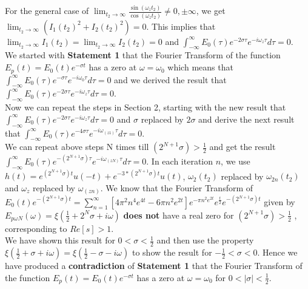 \documentclass[11pt]{elsarticle}
\begin{document}
For the general case of $\lim_{t_2 \to \infty} \frac{ \sin{ ( \omega_z t_2)}}{ \cos{ ( \omega_z t_2)}} \neq 0, \pm \infty$, we get $\lim_{t_2 \to \infty} (I_1(t_2)^{2} + I_2(t_2)^{2}) = 0$. This implies that $\lim_{t_2 \to \infty} I_1(t_2)= \lim_{t_2 \to \infty}I_2(t_2) = 0$ and $\int_{-\infty}^{\infty}     E_0(\tau) e^{-2 \sigma \tau} e^{-i  \omega_z \tau} d\tau = 0$. \\

We started with \textbf{Statement 1} that the Fourier Transform of the function $E_p(t) = E_0(t) e^{-\sigma t} $ has a zero at $\omega = \omega_{0}$ which means that $\int_{-\infty}^{\infty}    E_0(\tau) e^{- \sigma \tau} e^{-i \omega_0 \tau} d\tau = 0$ and we derived the result that $\int_{-\infty}^{\infty}    E_0(\tau) e^{-2 \sigma \tau} e^{-i  \omega_z \tau} d\tau = 0$.\\

Now we can repeat the steps in Section 2, starting with the new result that $\int_{-\infty}^{\infty}    E_0(\tau) e^{-2 \sigma \tau} e^{-i \omega_z \tau} d\tau = 0$ and $\sigma$ replaced by $2 \sigma$ and derive the next result that $\int_{-\infty}^{\infty}    E_0(\tau) e^{-4 \sigma \tau} e^{-i \omega_{(z1)} \tau} d\tau = 0$.\\

We can repeat above steps N times till $(2^{N+1} \sigma) > \frac{1}{2}$ and get the result $\int_{-\infty}^{\infty}    E_0(\tau) e^{-(2^{N+1} \sigma) \tau} e^{-i \omega_{(zN)} \tau} d\tau = 0$. In each iteration $n$, we use $h(t)=  e^{ (2^{N+1} \sigma) t} u(-t) + e^{ - 3*(2^{N+1} \sigma) t} u(t) $, $\omega_2(t_2)$ replaced by $\omega_{2n}(t_2)$ and $\omega_z$ replaced by $\omega_{(zn)}$. We know that  the Fourier Transform of $E_{0}(t) e^{-(2^{N+1} \sigma) t} =    \sum_{n=1}^{\infty}  [ 4 \pi^{2} n^{4} e^{4t}    - 6 \pi n^{2}   e^{2t} ]  e^{- \pi n^{2} e^{2t}} e^{\frac{t}{2}} e^{-(2^{N+1} \sigma) t}$ given by $E_{p\omega N}(\omega)=\xi(\frac{1}{2}+ 2^N \sigma + i \omega)$ \textbf{does not} have a real zero for $(2^{N+1} \sigma) > \frac{1}{2}$ , corresponding to $Re[s] > 1$. \\%

We have shown this result for $0 < \sigma < \frac{1}{2}$ and then use the property $\xi(\frac{1}{2} + \sigma + i \omega) = \xi(\frac{1}{2} - \sigma - i \omega)$ to show the result for $-\frac{1}{2} < \sigma < 0$. Hence we have produced a \textbf{contradiction} of  \textbf{Statement 1} that the Fourier Transform of the function $E_p(t) = E_0(t) e^{-\sigma t} $ has a zero at $\omega = \omega_{0}$ for  $0 < |\sigma| < \frac{1}{2}$.
\end{document}
